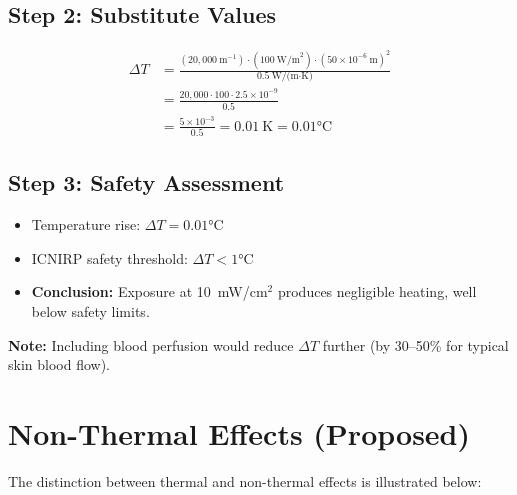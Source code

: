 \subsection*{Step 2: Substitute Values}
\begin{equation}
\begin{aligned}
\Delta T &= \frac{(20{,}000~\text{m}^{-1}) \cdot (100~\text{W/m}^2) \cdot (50 \times 10^{-6}~\text{m})^2}{0.5~\text{W/(m·K)}} \\
&= \frac{20{,}000 \cdot 100 \cdot 2.5 \times 10^{-9}}{0.5} \\
&= \frac{5 \times 10^{-3}}{0.5} = 0.01~\text{K} = 0.01°\text{C}
\end{aligned}
\end{equation}

\subsection*{Step 3: Safety Assessment}
\begin{itemize}
\item Temperature rise: $\Delta T = 0.01°$C
\item ICNIRP safety threshold: $\Delta T < 1°$C
\item \textbf{Conclusion:} Exposure at 10~mW/cm$^2$ produces negligible heating, well below safety limits.
\end{itemize}

\textbf{Note:} Including blood perfusion would reduce $\Delta T$ further (by 30--50\% for typical skin blood flow).

\section{Non-Thermal Effects (Proposed)}
\label{sec:non-thermal}

The distinction between thermal and non-thermal effects is illustrated below:

